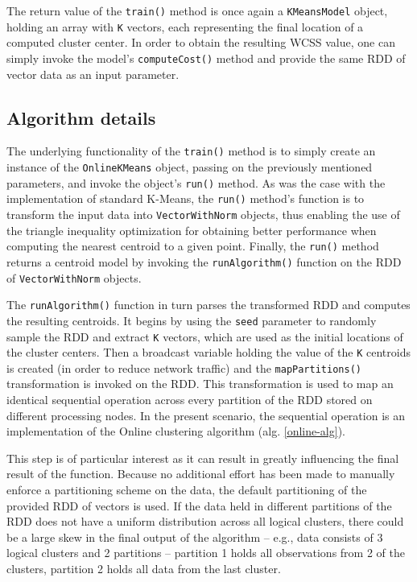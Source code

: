 \documentclass{l4proj}
\begin{document}
The return value of the \texttt{train()} method is once again a  \texttt{KMeansModel} object, holding an array with \texttt{K} vectors, each representing the final location of a computed cluster center. In order to obtain the resulting WCSS value, one can simply invoke the model's \texttt{computeCost()} method and provide the same RDD of vector data as an input parameter.

\subsection{Algorithm details}

The underlying functionality of the \texttt{train()} method is to simply create an instance of the \texttt{OnlineKMeans} object, passing on the previously mentioned parameters, and invoke the object's \texttt{run()} method. As was the case with the implementation of standard K-Means, the \texttt{run()} method's function is to transform the input data into \texttt{VectorWithNorm} objects, thus enabling the use of the triangle inequality optimization for obtaining better performance when computing the nearest centroid to a given point\cite{Triangle}. Finally, the \texttt{run()} method returns a centroid model by invoking the \texttt{runAlgorithm()} function on the RDD of \texttt{VectorWithNorm} objects.

The \texttt{runAlgorithm()} function in turn parses the transformed RDD and computes the resulting centroids. It begins by using the \texttt{seed} parameter to randomly sample the RDD and extract \texttt{K} vectors, which are used as the initial locations of the cluster centers. Then a broadcast variable holding the value of the \texttt{K} centroids is created (in order to reduce network traffic) and the \texttt{mapPartitions()} transformation is invoked on the RDD. This transformation is used to map an identical sequential operation across every partition of the RDD stored on different processing nodes. In the present scenario, the sequential operation is an implementation of the Online clustering algorithm (alg. \ref{online-alg}).

This step is of particular interest as it can result in greatly influencing the final result of the function. Because no additional effort has been made to manually enforce a partitioning scheme on the data, the default partitioning of the provided RDD of vectors is used. If the data held in different partitions of the RDD does not have a uniform distribution across all logical clusters, there could be a large skew in the final output of the algorithm -- e.g., data consists of 3 logical clusters and 2 partitions -- partition 1 holds all observations from 2 of the clusters, partition 2 holds all data from the last cluster.
\end{document}
